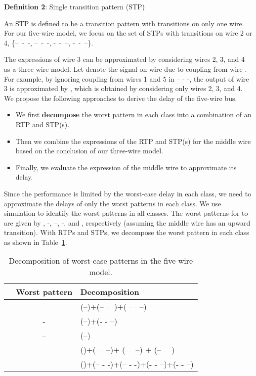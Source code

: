 \documentclass[10pt,journal]{IEEEtran}
\begin{document}
\textbf{Definition 2}: Single transition pattern (STP)

An STP is defined to be a transition pattern with transitions on only one wire. For our five-wire model, we focus on the set of STPs with transitions on wire 2 or 4, \{--~-~-, --~-~-, -~-~--, -~-~--\}.

The expressions of wire 3 can be approximated by considering wires 2, 3, and 4 as a three-wire model. Let  denote the signal on wire  due to coupling from wire . For example, by ignoring coupling from wires 1 and 5 in -- - -, the output of wire 3 is approximated by  , which is obtained by considering only wires 2, 3, and 4.\\

We propose the following approaches to derive the delay of the five-wire bus.
\begin{itemize}
\item We first \textbf{decompose} the worst pattern in each class into a combination of an RTP and STP(s).
\item Then we combine the expressions of the RTP and STP(s) for the middle wire based on the conclusion of our three-wire model.
\item Finally, we evaluate the expression of the middle wire to approximate its delay.
\end{itemize}

Since the performance is limited by the worst-case delay in each class, we need to approximate the delays of only the worst patterns in each class.
We use simulation to identify the worst patterns in all classes.
The worst patterns for  to  are given by , -, --, -, and , respectively (assuming the middle wire has an upward transition). With RTPs and STPs, we decompose the worst pattern in each class as shown in Table~\ref{tab:decomp}.
\begin{table}
\caption{Decomposition of worst-case patterns in the five-wire model.} \label{tab:decomp}
\begin{center}
\begin{tabular}{|c|c|l|}
\hline
 & Worst pattern & Decomposition\\
\hline
 &  & (--)+(-- - -)+( - - --)\\
\hline
 & - & (--)+(- - --)\\
\hline
 & -- & (--)\\
\hline
 & - & ()+(- - --)+ (- - --) + (-- - -)\\
\hline
 &  & ()+(-- - -)+(-- - -)+(- - --)+(- - --)\\
\hline
\end{tabular}
\end{center}
\end{table}
\end{document}
